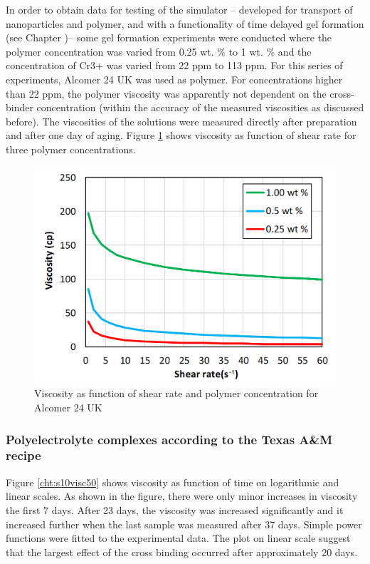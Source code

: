 In order to obtain data for testing of the simulator \--- developed for transport of nanoparticles and polymer, and with a functionality of time delayed gel formation (see Chapter \what)\--- some gel formation experiments were conducted where the polymer concentration was varied from 0.25 wt. \% to 1 wt. \% and the concentration of Cr3+ was varied from 22 ppm to 113 ppm. For this series of experiments, Alcomer 24 UK was used as polymer. For concentrations higher than 22 ppm, the polymer viscosity was apparently not dependent on the cross-binder concentration (within the accuracy of the measured viscosities as discussed before). The viscosities of the solutions were measured directly after preparation and after one day of aging. Figure \ref{cht:viscAlco} shows viscosity as function of shear rate for three polymer concentrations. 
\begin{figure}
    \centering
    \includegraphics[width=.75\textwidth]{img/cht/viscAlcomer.png}
    \caption{Viscosity as function of shear rate and polymer concentration for Alcomer 24 UK}
    \label{cht:viscAlco}
\end{figure}

\subsubsection{Polyelectrolyte complexes according to the Texas A\&M recipe}

Figure \ref{cht:s10visc50} shows viscosity as function of time on logarithmic and linear scales. As shown in the figure, there were only minor increases in viscosity the first 7 days. After 23 days, the viscosity was increased significantly and it increased further when the last sample was measured after 37 days. Simple power functions were fitted to the experimental data. The plot on linear scale suggest that the largest effect of the cross binding occurred after approximately 20 days. 

